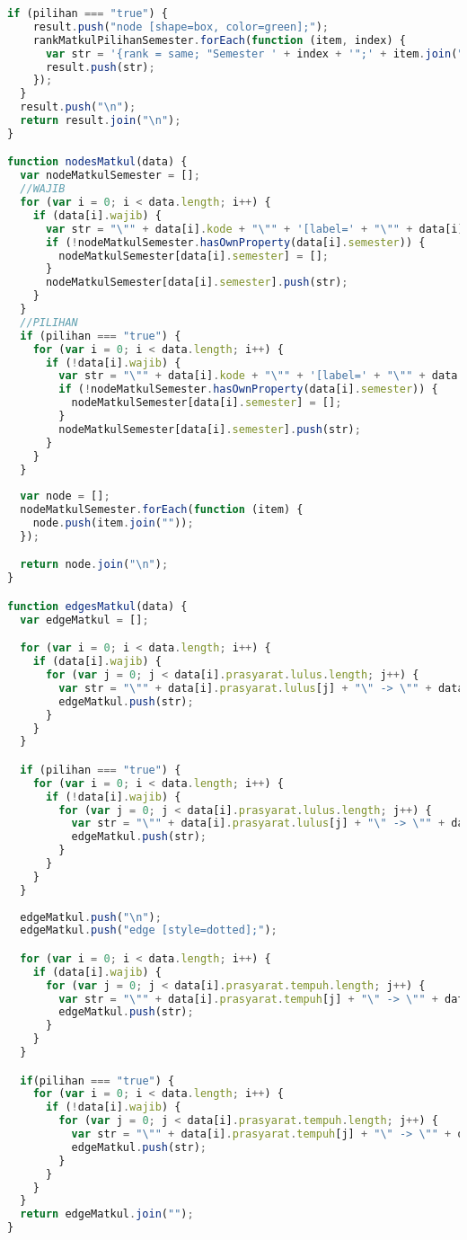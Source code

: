 \begin{lstlisting}[language=Javascript, caption=indexs.js]
  if (pilihan === "true") {
    result.push("node [shape=box, color=green];");
    rankMatkulPilihanSemester.forEach(function (item, index) {
      var str = '{rank = same; "Semester ' + index + '";' + item.join("") + '}';
      result.push(str);
    });
  }
  result.push("\n");
  return result.join("\n");
}

function nodesMatkul(data) {
  var nodeMatkulSemester = [];
  //WAJIB
  for (var i = 0; i < data.length; i++) {
    if (data[i].wajib) {
      var str = "\"" + data[i].kode + "\"" + '[label=' + "\"" + data[i].kode + "-0" + data[i].sks + "\n" + data[i].nama + "\"" + ']';
      if (!nodeMatkulSemester.hasOwnProperty(data[i].semester)) {
        nodeMatkulSemester[data[i].semester] = [];
      }
      nodeMatkulSemester[data[i].semester].push(str);
    }
  }
  //PILIHAN
  if (pilihan === "true") {
    for (var i = 0; i < data.length; i++) {
      if (!data[i].wajib) {
        var str = "\"" + data[i].kode + "\"" + '[label=' + "\"" + data[i].kode + "-0" + data[i].sks + "\n" + data[i].nama + "\"" + ']';
        if (!nodeMatkulSemester.hasOwnProperty(data[i].semester)) {
          nodeMatkulSemester[data[i].semester] = [];
        }
        nodeMatkulSemester[data[i].semester].push(str);
      }
    }
  }
  
  var node = [];
  nodeMatkulSemester.forEach(function (item) {
    node.push(item.join(""));
  });

  return node.join("\n");
}

function edgesMatkul(data) {
  var edgeMatkul = [];

  for (var i = 0; i < data.length; i++) {
    if (data[i].wajib) {
      for (var j = 0; j < data[i].prasyarat.lulus.length; j++) {
        var str = "\"" + data[i].prasyarat.lulus[j] + "\" -> \"" + data[i].kode + "\"";
        edgeMatkul.push(str);
      }
    }
  }

  if (pilihan === "true") {
    for (var i = 0; i < data.length; i++) {
      if (!data[i].wajib) {
        for (var j = 0; j < data[i].prasyarat.lulus.length; j++) {
          var str = "\"" + data[i].prasyarat.lulus[j] + "\" -> \"" + data[i].kode + "\"";
          edgeMatkul.push(str);
        }
      }
    }
  }
  
  edgeMatkul.push("\n");
  edgeMatkul.push("edge [style=dotted];");

  for (var i = 0; i < data.length; i++) {
    if (data[i].wajib) {
      for (var j = 0; j < data[i].prasyarat.tempuh.length; j++) {
        var str = "\"" + data[i].prasyarat.tempuh[j] + "\" -> \"" + data[i].kode + "\"";
        edgeMatkul.push(str);
      }
    }
  }

  if(pilihan === "true") {
    for (var i = 0; i < data.length; i++) {
      if (!data[i].wajib) {
        for (var j = 0; j < data[i].prasyarat.tempuh.length; j++) {
          var str = "\"" + data[i].prasyarat.tempuh[j] + "\" -> \"" + data[i].kode + "\"";
          edgeMatkul.push(str);
        }
      }
    }
  }
  return edgeMatkul.join("");
}

\end{lstlisting}

 

